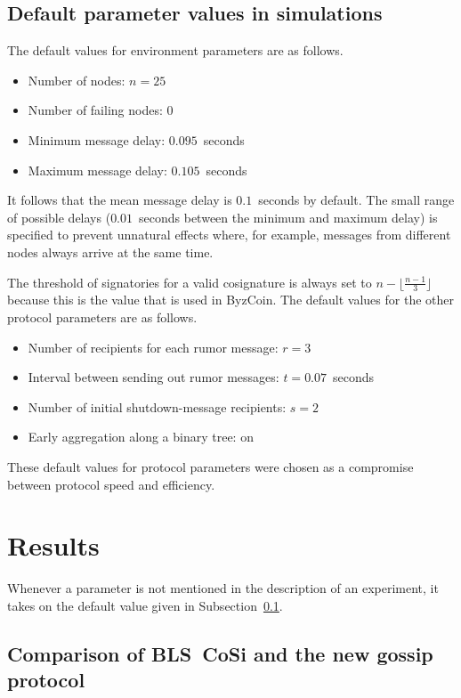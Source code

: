 \subsection{Default parameter values in simulations}
\label{defaults}

The default values for environment parameters are as follows.

\begin{itemize}
    \item Number of nodes: $n = 25$
    \item Number of failing nodes: $0$
    \item Minimum message delay: $0.095$~seconds
    \item Maximum message delay: $0.105$~seconds
\end{itemize}

It follows that the mean message delay is $0.1$~seconds by default.
The small range of possible delays ($0.01$~seconds between the minimum and maximum delay) is specified to prevent unnatural effects where, for example, messages from different nodes always arrive at the same time.

The threshold of signatories for a valid cosignature is always set to $n - \lfloor \frac{n-1}{3} \rfloor$ because this is the value that is used in ByzCoin.
The default values for the other protocol parameters are as follows.

\begin{itemize}
    \item Number of recipients for each rumor message: $r = 3$
    \item Interval between sending out rumor messages: $t = 0.07$~seconds
    \item Number of initial shutdown-message recipients: $s = 2$
    \item Early aggregation along a binary tree: on
\end{itemize}

These default values for protocol parameters were chosen as a compromise between protocol speed and efficiency.


\section{Results}
\label{results}

Whenever a parameter is not mentioned in the description of an experiment, it takes on the default value given in Subsection~\ref{defaults}.

\subsection{Comparison of BLS~CoSi and the new gossip protocol}


